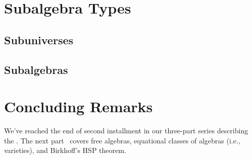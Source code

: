 \documentclass[a4paper,UKenglish,cleveref,autoref,thm-restate,12pt]{../lipics-v2021-wjd}
\begin{document}
\section{Subalgebra Types}\label{sec:subalgebra-types}
\subsection{Subuniverses}\label{sec:subuniverses}\firstsentence{\ualibSubuniverses}{\urlSubuniverses}
%
\subsection{Subalgebras}\label{sec:subalgebras}\firstsentence{\ualibSubalgebras}{\urlSubalgebras}
%




\section{Concluding Remarks}\label{sec:concluding-remarks}
We've reached the end of second installment in our three-part series describing the \agdaualib.  The next part~\cite{DeMeo:2021-3} covers free algebras, equational classes of algebras (i.e., varieties), and Birkhoff's HSP theorem.


\end{document}
